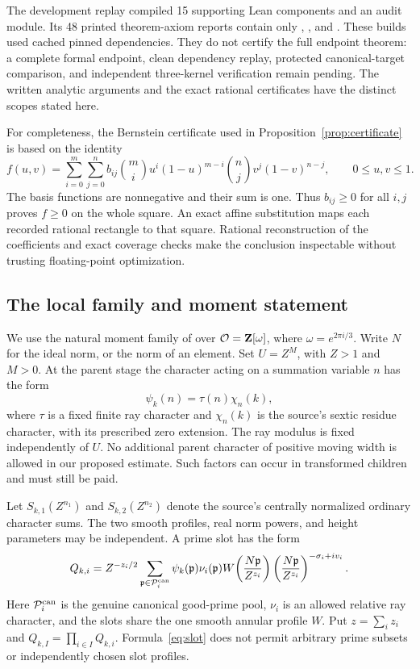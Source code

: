 The development replay compiled 15 supporting Lean components and an audit
module. Its 48 printed theorem-axiom reports contain only
, , and .
These builds used cached pinned dependencies. They do not certify the full
endpoint theorem: a complete formal endpoint, clean dependency replay,
protected canonical-target comparison, and independent three-kernel
verification remain pending. The written analytic arguments and the exact
rational certificates have the distinct scopes stated here.

For completeness, the Bernstein certificate used in
Proposition~\ref{prop:certificate} is based on the identity
\[
 f(u,v)=\sum_{i=0}^{m}\sum_{j=0}^{n}
 b_{ij}\binom mi u^i(1-u)^{m-i}\binom nj v^j(1-v)^{n-j},
 \qquad 0\le u,v\le1.
\]
The basis functions are nonnegative and their sum is one. Thus
$b_{ij}\ge0$ for all $i,j$ proves $f\ge0$ on the whole square.
An exact affine substitution maps each recorded rational rectangle to
that square. Rational reconstruction of the coefficients and exact
coverage checks make the conclusion inspectable without trusting
floating-point optimization.


\subsection{The local family and moment statement}
We use the natural moment family of \cite[Appendix B3.4]{collet} over
$\mathcal O=\mathbf Z[\omega]$, where $\omega=e^{2\pi i/3}$. Write $N$ for the
ideal norm, or the norm of an element. Set $U=Z^M$, with $Z>1$ and
$M>0$. At the parent stage the character acting on a summation variable
$n$ has the form
\[
 \psi_k(n)=\tau(n)\chi_n(k),
\]
where $\tau$ is a fixed finite ray character and $\chi_n(k)$ is the
source's sextic residue character, with its prescribed zero extension.
The ray modulus is fixed independently of $U$. No additional parent
character of positive moving width is allowed in our proposed estimate.
Such factors can occur in transformed children and must still be paid.

Let $S_{k,1}(Z^{n_1})$ and $S_{k,2}(Z^{n_2})$ denote the source's
centrally normalized ordinary character sums. The two smooth profiles,
real norm powers, and height parameters may be independent. A prime
slot has the form
\begin{equation}\label{eq:slot}
 Q_{k,i}=Z^{-z_i/2}
 \sum_{\mathfrak p\in\mathcal P_i^{\rm can}}
 \psi_k(\mathfrak p)\nu_i(\mathfrak p)
 W\!\left(\frac{N\mathfrak p}{Z^{z_i}}\right)
 \left(\frac{N\mathfrak p}{Z^{z_i}}\right)^{-\sigma_i+iv_i}.
\end{equation}
Here $\mathcal P_i^{\rm can}$ is the genuine canonical good-prime pool,
$\nu_i$ is an allowed relative ray character, and the slots share the
one smooth annular profile $W$. Put $z=\sum_i z_i$ and
$Q_{k,I}=\prod_{i\in I}Q_{k,i}$. Formula~\eqref{eq:slot} does not
permit arbitrary prime subsets or independently chosen slot profiles.

